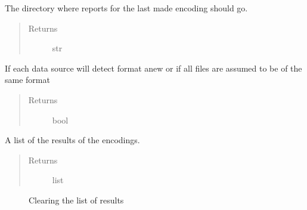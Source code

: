 \documentclass[letterpaper,10pt,english]{sphinxmanual}
\begin{document}
\begin{fulllineitems}
\begin{fulllineitems}
\label{fseq.reading:fseq.reading.seq_reader.SeqReader.reportDirectory}
The directory where reports for the last made encoding should go.
\begin{quote}\begin{description}
\item[{Returns}] \leavevmode
str

\end{description}\end{quote}

\end{fulllineitems}


\begin{fulllineitems}
\label{fseq.reading:fseq.reading.seq_reader.SeqReader.resetSeqEncoder}
If each data source will detect format anew or if all files are
assumed to be of the same format
\begin{quote}\begin{description}
\item[{Returns}] \leavevmode
bool

\end{description}\end{quote}

\end{fulllineitems}


\begin{fulllineitems}
\label{fseq.reading:fseq.reading.seq_reader.SeqReader.results}
A list of the results of the encodings.
\begin{quote}\begin{description}
\item[{Returns}] \leavevmode
list

\end{description}\end{quote}



\begin{description}
\item[{}] \leavevmode
Clearing the list of results

\end{description}




\end{fulllineitems}
\end{fulllineitems}
\end{document}
